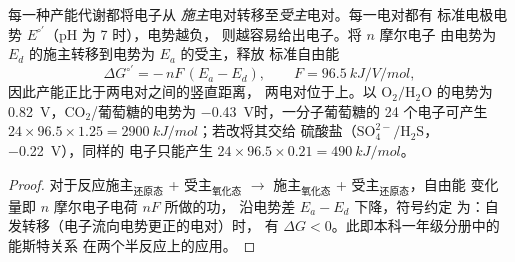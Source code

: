 \begin{theorem}[氧化还原对的能量]\label{thm:b2:microbial-metabolism:redox}
每一种产能代谢都将电子从
\emph{施主}电对转移至\emph{受主}电对。每一电对都有
标准电极电势 $E^{\circ\prime}$（pH 为 7 时），电势越负，
则越容易给出电子。将 $n$ 摩尔电子
由电势为 $E_d$ 的施主转移到电势为 $E_a$ 的受主，释放
标准自由能
\[
\Delta G^{\circ\prime} = -\,n F\,(E_a - E_d), \qquad F = \qty{96.5}{kJ/V/mol},
\]
因此产能正比于两电对之间的竖直距离，
两电对位于\emph{}上。以
$\mathrm{O_2/H_2O}$ 的电势为 \qty{+0.82}{V}，$\mathrm{CO_2}$/葡萄糖的电势为
\qty{-0.43}{V}时，一分子葡萄糖的 24 个电子可产生
$24\times 96.5\times 1.25 = \qty{2900}{kJ/mol}$；若改将其交给
硫酸盐（$\mathrm{SO_4^{2-}/H_2S}$，\qty{-0.22}{V}），同样的
电子只能产生 $24\times 96.5\times 0.21 = \qty{490}{kJ/mol}$。
\end{theorem}
\begin{proof}
对于反应施主$_{\text{还原态}}$ + 受主$_{\text{氧化态}}$
$\to$ 施主$_{\text{氧化态}}$ + 受主$_{\text{还原态}}$，自由能
变化量即 $n$ 摩尔电子电荷 $nF$ 所做的功，
沿电势差 $E_a - E_d$ 下降，符号约定
为：自发转移（电子流向电势更正的电对）时，
有 $\Delta G < 0$。此即本科一年级分册中的能斯特关系
在两个半反应上的应用。
\end{proof}

